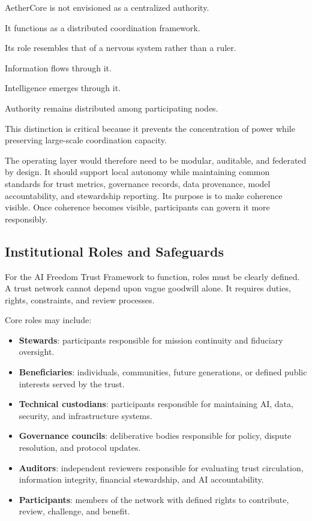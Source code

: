 \documentclass[12pt]{article}
\begin{document}
AetherCore is not envisioned as a centralized authority.

It functions as a distributed coordination framework.

Its role resembles that of a nervous system rather than a ruler.

Information flows through it.

Intelligence emerges through it.

Authority remains distributed among participating nodes.

This distinction is critical because it prevents the concentration of power while preserving large-scale coordination capacity.

The operating layer would therefore need to be modular, auditable, and federated by design. It should support local autonomy while maintaining common standards for trust metrics, governance records, data provenance, model accountability, and stewardship reporting. Its purpose is to make coherence visible. Once coherence becomes visible, participants can govern it more responsibly.

\subsection{Institutional Roles and Safeguards}

For the AI Freedom Trust Framework to function, roles must be clearly defined. A trust network cannot depend upon vague goodwill alone. It requires duties, rights, constraints, and review processes.

Core roles may include:

\begin{itemize}
  \item \textbf{Stewards}: participants responsible for mission continuity and fiduciary oversight.
  \item \textbf{Beneficiaries}: individuals, communities, future generations, or defined public interests served by the trust.
  \item \textbf{Technical custodians}: participants responsible for maintaining AI, data, security, and infrastructure systems.
  \item \textbf{Governance councils}: deliberative bodies responsible for policy, dispute resolution, and protocol updates.
  \item \textbf{Auditors}: independent reviewers responsible for evaluating trust circulation, information integrity, financial stewardship, and AI accountability.
  \item \textbf{Participants}: members of the network with defined rights to contribute, review, challenge, and benefit.
\end{itemize}
\end{document}
